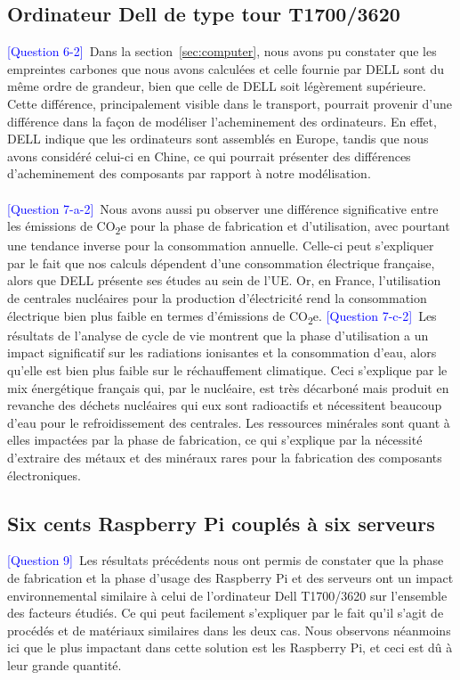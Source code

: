 \documentclass[12pt,a4paper]{paper}
\begin{document}
\subsection{Ordinateur Dell de type tour T1700/3620}
\textcolor{blue}{[Question 6-2]}~Dans la section~\ref{sec:computer}, nous avons pu constater que les empreintes carbones que nous avons calculées et celle fournie par DELL sont du même ordre de grandeur, bien que celle de DELL soit légèrement supérieure. Cette différence, principalement visible dans le transport, pourrait provenir d'une différence dans la façon de modéliser l'acheminement des ordinateurs. En effet, DELL indique que les ordinateurs sont assemblés en Europe, tandis que nous avons considéré celui-ci en Chine, ce qui pourrait présenter des différences d'acheminement des composants par rapport à notre modélisation.\\ \\
\textcolor{blue}{[Question 7-a-2]}~Nous avons aussi pu observer une différence significative entre les émissions de CO\textsubscript{2}e pour la phase de fabrication et d'utilisation, avec pourtant une tendance inverse pour la consommation annuelle. Celle-ci peut s'expliquer par le fait que nos calculs dépendent d'une consommation électrique française, alors que DELL présente ses études au sein de l'UE. Or, en France, l'utilisation de centrales nucléaires pour la production d'électricité rend la consommation électrique bien plus faible en termes d'émissions de CO\textsubscript{2}e.
\textcolor{blue}{[Question 7-c-2]}~Les résultats de l'analyse de cycle de vie montrent que la phase d'utilisation a un impact significatif sur les radiations ionisantes et la consommation d'eau, alors qu'elle est bien plus faible sur le réchauffement climatique. Ceci s'explique par le mix énergétique français qui, par le nucléaire, est très décarboné mais produit en revanche des déchets nucléaires qui eux sont radioactifs et nécessitent beaucoup d'eau pour le refroidissement des centrales.
Les ressources minérales sont quant à elles impactées par la phase de fabrication, ce qui s'explique par la nécessité d'extraire des métaux et des minéraux rares pour la fabrication des composants électroniques.


\subsection{Six cents Raspberry Pi couplés à six serveurs}
\textcolor{blue}{[Question 9]}~Les résultats précédents nous ont permis de constater que la phase de fabrication et la phase d'usage des Raspberry Pi et des serveurs ont un impact environnemental similaire à celui de l'ordinateur Dell T1700/3620 sur l'ensemble des facteurs étudiés. Ce qui peut facilement s'expliquer par le fait qu'il s'agit de procédés et de matériaux similaires dans les deux cas. Nous observons néanmoins ici que le plus impactant dans cette solution est les Raspberry Pi, et ceci est dû à leur grande quantité.
\end{document}
